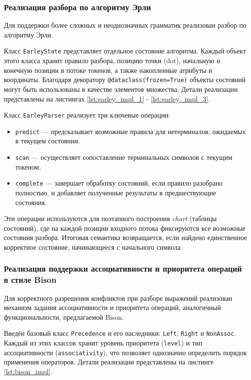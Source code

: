 \documentclass[14pt, russian]{scrartcl}
\begin{document}
\subsubsection{Реализация разбора по алгоритму Эрли}

Для поддержки более сложных и неоднозначных грамматик реализован разбор по алгоритму Эрли.

Класс \texttt{EarleyState} представляет отдельное состояние алгоритма. Каждый объект этого класса хранит
правило разбора, позицию точки (dot), начальную и конечную позиции в потоке токенов, а также
накопленные атрибуты и координаты. Благодаря декоратору \texttt{@dataclass(frozen=True)} объекты состояний
могут быть использованы в качестве элементов множества. Детали реализации представлены на листингах
\ref{lst:earley_impl_1} - \ref{lst:earley_impl_3}.

Класс \texttt{EarleyParser} реализует три ключевые операции:
\begin{itemize}
	\item \texttt{predict} --- предсказывает возможные правила для нетерминалов, ожидаемых в текущем состоянии.
	\item \texttt{scan} --- осуществляет сопоставление терминальных символов с текущим токеном.
	\item \texttt{complete} --- завершает обработку состояний, если правило разобрано
	полностью, и добавляет полученные результаты в предшествующие состояния.
\end{itemize}
Эти операции используются для поэтапного построения \emph{chart} (таблицы состояний), где на
каждой позиции входного потока фиксируются все возможные состояния разбора. Итоговая семантика
возвращается, если найдено единственное корректное состояние, начинающееся с начального символа.

\subsubsection{Реализация поддержки ассоциативности и приоритета операций в стиле Bison}

Для корректного разрешения конфликтов при разборе выражений реализован механизм задания ассоциативности и
приоритета операций, аналогичный функциональности, предлагаемой Bison.

Введён базовый класс \texttt{Precedence} и его наследники: \texttt{Left}, \texttt{Right} и \texttt{NonAssoc}.
Каждый из этих классов хранит уровень приоритета (\texttt{level}) и тип ассоциативности (\texttt{associativity}),
что позволяет однозначно определить порядок применения операторов. Детали реализации представлены на листинге
\ref{lst:bison_impl}.
\end{document}
